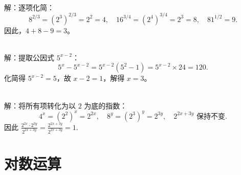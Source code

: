 \begin{MyAnswer}[ref={ex:exponent2}]
    \Question {}\\ 
    解：逐项化简：
    $$
    8^{2/3} = (2^3)^{2/3} = 2^2 = 4, \quad 
    16^{3/4} = (2^4)^{3/4} = 2^3 = 8, \quad 
    81^{1/2} = 9.
    $$
    因此，$4 + 8 - 9 = 3$。  
 
    \Question {}\\ 
    解：提取公因式 $5^{x-2}$：
    $$
    5^{x} - 5^{x-2} = 5^{x-2}(5^2 - 1) = 5^{x-2} \times 24 = 120.
    $$
    化简得 $5^{x-2} = 5$，故 $x - 2 = 1$，解得 $x = 3$。

    \Question {}\\ 
    解：将所有项转化为以 $2$ 为底的指数：
    $$
    4^x = (2^2)^x = 2^{2x}, \quad 8^y = (2^3)^y = 2^{3y}, \quad 2^{2x + 3y} \text{ 保持不变}.
    $$
    因此
    $
    \frac{2^{2x} \cdot 2^{3y}}{2^{2x + 3y}} = \frac{2^{2x + 3y}}{2^{2x + 3y}} = 1.
    $ %
\end{MyAnswer}



\clearpage

\section{对数运算}

